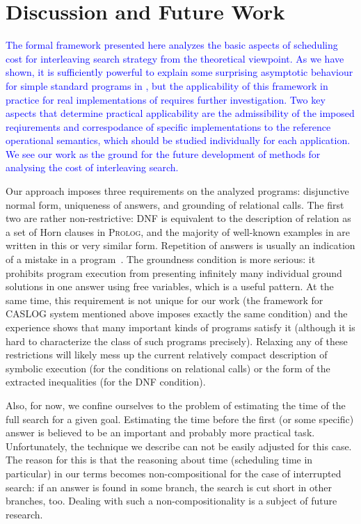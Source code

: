 \section{Discussion and Future Work}
\label{sec:discussion}

\textcolor{blue}{
The formal framework presented here analyzes the basic aspects of scheduling cost for interleaving search strategy from the theoretical viewpoint.
As we have shown, it is sufficiently powerful to explain some surprising asymptotic behaviour for simple standard programs in \mK,
but the applicability of this framework in practice for real implementations of \mK requires further investigation.
Two key aspects that determine practical applicability are the admissibility of the imposed reqiurements and
correspodance of specific \mK implementations to the reference operational semantics, which should be studied individually for each application.
We see our work as the ground for the future development of methods for analysing the cost of interleaving search.
}

Our approach imposes three requirements on the analyzed programs: disjunctive normal form, uniqueness of answers, and grounding of relational calls.
The first two are rather non-restrictive: DNF is equivalent to the description of relation as a set of Horn clauses in \textsc{Prolog},
and the majority of well-known examples in \mK are written in this or very similar form. Repetition of answers is usually an indication
of a mistake in a program~\cite{WillsThesis}. The groundness condition is more serious: it prohibits program execution from presenting infinitely
many individual ground solutions in one answer using free variables, which is a useful pattern. At the same time, this requirement is
not unique for our work (the framework for \textsc{CASLOG} system mentioned above imposes exactly the same condition) and the experience
shows that many important kinds of programs satisfy it (although it is hard to characterize the class of such programs precisely).
Relaxing any of these restrictions will likely mess up the current relatively compact description of symbolic execution (for
the conditions on relational calls) or the form of the extracted inequalities (for the DNF condition).

Also, for now, we confine ourselves to the problem of estimating the time of the full search for a given goal. Estimating the time before
the first (or some specific) answer is believed to be an important and probably more practical task. Unfortunately, the technique we describe
can not be easily adjusted for this case. The reason for this is that the reasoning about time (scheduling time in particular) in our
terms becomes non-compositional for the case of interrupted search: if an answer is found in some branch, the search is cut short in
other branches, too. Dealing with such a non-compositionality is a subject of future research.

